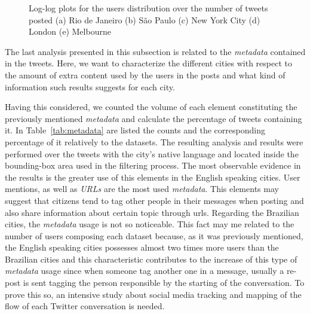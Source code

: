 \begin{figure}[h]
	\caption[Log-log plots of users distribution]{Log-log plots for the users distribution over the number of tweets posted (a) Rio de Janeiro (b) São Paulo (c) New York City (d) London (e) Melbourne}
	\label{fig:loglog-plots-users}
\end{figure}

The last analysis presented in this subsection is related to the \textit{metadata} contained in the tweets. Here, we want to characterize the different cities with respect to the amount of extra content used by the users in the posts and what kind of information such results suggests for each city.

Having this considered, we counted the volume of each element constituting the previously mentioned \textit{metadata} and calculate the percentage of tweets containing it. In Table~\ref{tab:metadata} are listed the counts and the corresponding percentage of it relatively to the datasets. The resulting analysis and results were performed over the tweets with the city's native language and located inside the bounding-box area used in the filtering process.
The most observable evidence in the results is the greater use of this elements in the English speaking cities. User mentions, as well as \textit{URLs} are the most used \textit{metadata}. This elements may suggest that citizens tend to tag other people in their messages when posting and also share information about certain topic through urls. Regarding the Brazilian cities, the \textit{metadata} usage is not so noticeable. This fact may me related to the number of users composing each dataset because, as it was previously mentioned, the English speaking cities possesses almost two times more users than the Brazilian cities and this characteristic contributes to the increase of this type of \textit{metadata} usage since when someone tag another one in a message, usually a re-post is sent tagging the person responsible by the starting of the conversation. To prove this so, an intensive study about social media tracking and mapping of the flow of each Twitter conversation is needed.

